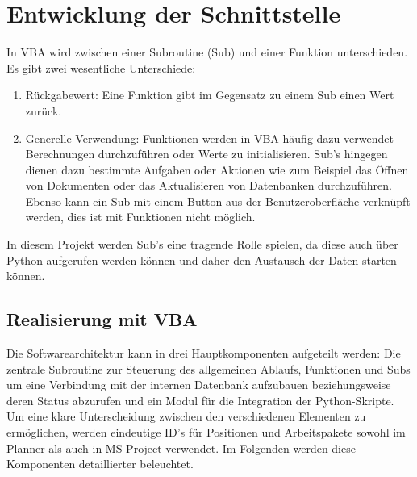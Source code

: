 \documentclass[11pt,a4paper]{report}
\begin{document}
\section{Entwicklung der Schnittstelle}
In VBA wird zwischen einer Subroutine (Sub) und einer Funktion unterschieden. Es gibt zwei wesentliche Unterschiede:
\begin{enumerate}
    \item Rückgabewert: Eine Funktion gibt im Gegensatz zu einem Sub einen Wert zurück.
    \item Generelle Verwendung: Funktionen werden in VBA häufig dazu verwendet Berechnungen durchzuführen oder Werte zu initialisieren. Sub's hingegen dienen dazu bestimmte Aufgaben oder Aktionen wie zum Beispiel das Öffnen von Dokumenten oder das Aktualisieren von Datenbanken durchzuführen. Ebenso kann ein Sub mit einem Button aus der Benutzeroberfläche verknüpft werden, dies ist mit Funktionen nicht möglich.
\end{enumerate}
In diesem Projekt werden Sub's eine tragende Rolle spielen, da diese auch über Python aufgerufen werden können und daher den Austausch der Daten starten können.


\subsection{Realisierung mit VBA}
Die Softwarearchitektur kann in drei Hauptkomponenten aufgeteilt werden: Die zentrale Subroutine zur Steuerung des allgemeinen Ablaufs, Funktionen und Subs um eine Verbindung mit der internen Datenbank aufzubauen beziehungsweise deren Status abzurufen und ein Modul für die Integration der Python-Skripte. Um eine klare Unterscheidung zwischen den verschiedenen Elementen zu ermöglichen, werden eindeutige ID's für Positionen und Arbeitspakete sowohl im Planner als auch in MS Project verwendet. Im Folgenden werden diese Komponenten detaillierter beleuchtet.
\end{document}
